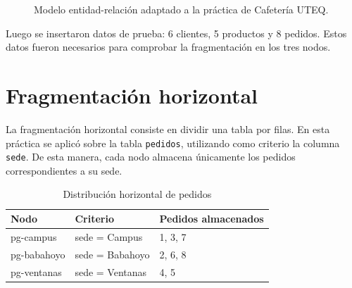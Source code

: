 \documentclass[12pt,a4paper]{article}
\begin{document}
\begin{figure}[H]
\centering
{}
\caption{Modelo entidad-relación adaptado a la práctica de Cafetería UTEQ.}
\end{figure}

Luego se insertaron datos de prueba: 6 clientes, 5 productos y 8 pedidos. Estos datos fueron necesarios para comprobar la fragmentación en los tres nodos.

\section{Fragmentación horizontal}

La fragmentación horizontal consiste en dividir una tabla por filas. En esta práctica se aplicó sobre la tabla \texttt{pedidos}, utilizando como criterio la columna \texttt{sede}. De esta manera, cada nodo almacena únicamente los pedidos correspondientes a su sede.

\begin{table}[H]
\centering
\caption{Distribución horizontal de pedidos}
\begin{tabular}{lll}
\toprule
\textbf{Nodo} & \textbf{Criterio} & \textbf{Pedidos almacenados} \\
\midrule
pg-campus & sede = Campus & 1, 3, 7 \\
pg-babahoyo & sede = Babahoyo & 2, 6, 8 \\
pg-ventanas & sede = Ventanas & 4, 5 \\
\bottomrule
\end{tabular}
\end{table}
\end{document}
